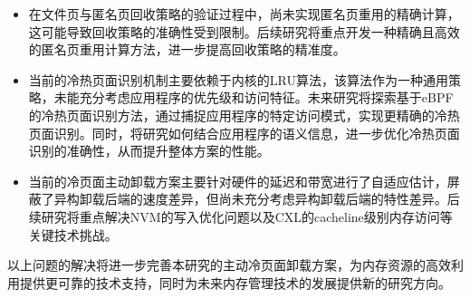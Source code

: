 \begin{itemize}
    \item 在文件页与匿名页回收策略的验证过程中，尚未实现匿名页重用的精确计算，这可能导致回收策略的准确性受到限制。后续研究将重点开发一种精确且高效的匿名页重用计算方法，进一步提高回收策略的精准度。

    \item 当前的冷热页面识别机制主要依赖于内核的LRU算法，该算法作为一种通用策略，未能充分考虑应用程序的优先级和访问特征。未来研究将探索基于eBPF的冷热页面识别方法，通过捕捉应用程序的特定访问模式，实现更精确的冷热页面识别。同时，将研究如何结合应用程序的语义信息，进一步优化冷热页面识别的准确性，从而提升整体方案的性能。

    \item 当前的冷页面主动卸载方案主要针对硬件的延迟和带宽进行了自适应估计，屏蔽了异构卸载后端的速度差异，但尚未充分考虑异构卸载后端的特性差异。后续研究将重点解决NVM的写入优化问题以及CXL的cacheline级别内存访问等关键技术挑战。

\end{itemize}

以上问题的解决将进一步完善本研究的主动冷页面卸载方案，为内存资源的高效利用提供更可靠的技术支持，同时为未来内存管理技术的发展提供新的研究方向。